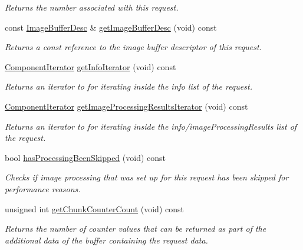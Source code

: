 \begin{DoxyCompactItemize}
\begin{DoxyCompactList}\small\item\em Returns the number associated with this request. \end{DoxyCompactList}\item 
const \hyperlink{classmv_i_m_p_a_c_t_1_1acquire_1_1_image_buffer_desc}{Image\+Buffer\+Desc} \& \hyperlink{classmv_i_m_p_a_c_t_1_1acquire_1_1_request_a76ee1fe02ab7a1fcd5f894a317353f39}{get\+Image\+Buffer\+Desc} (void) const 
\begin{DoxyCompactList}\small\item\em Returns a const reference to the image buffer descriptor of this request. \end{DoxyCompactList}\item 
\hyperlink{group___common_interface_ga461a5ba2197d9e599ee35e2514d684ef}{Component\+Iterator} \hyperlink{classmv_i_m_p_a_c_t_1_1acquire_1_1_request_a1d82ad8332a4fd79db9bcb59970836f1}{get\+Info\+Iterator} (void) const 
\begin{DoxyCompactList}\small\item\em Returns an iterator to for iterating inside the info list of the request. \end{DoxyCompactList}\item 
\hyperlink{group___common_interface_ga461a5ba2197d9e599ee35e2514d684ef}{Component\+Iterator} \hyperlink{classmv_i_m_p_a_c_t_1_1acquire_1_1_request_a3df38a3b0375cea7fed2826b62163264}{get\+Image\+Processing\+Results\+Iterator} (void) const 
\begin{DoxyCompactList}\small\item\em Returns an iterator to for iterating inside the info/image\+Processing\+Results list of the request. \end{DoxyCompactList}\item 
bool \hyperlink{classmv_i_m_p_a_c_t_1_1acquire_1_1_request_a523d15ab27c20de51f0c5ffd41ff3834}{has\+Processing\+Been\+Skipped} (void) const 
\begin{DoxyCompactList}\small\item\em Checks if image processing that was set up for this request has been skipped for performance reasons. \end{DoxyCompactList}\item 
unsigned int \hyperlink{classmv_i_m_p_a_c_t_1_1acquire_1_1_request_af7282a37729fa0a4e02f0e77d9a39d27}{get\+Chunk\+Counter\+Count} (void) const 
\begin{DoxyCompactList}\small\item\em Returns the number of counter values that can be returned as part of the additional data of the buffer containing the request data. \end{DoxyCompactList}\item 

\end{DoxyCompactItemize}
